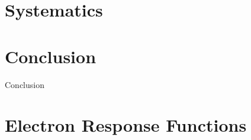 \documentclass{cmspaper}
\begin{document}
\section{Systematics}

\section{Conclusion}

Conclusion




\appendix
\appendixpage

\section{Electron Response Functions}
\label{sec:ElectronResponseFunctions}
\end{document}
